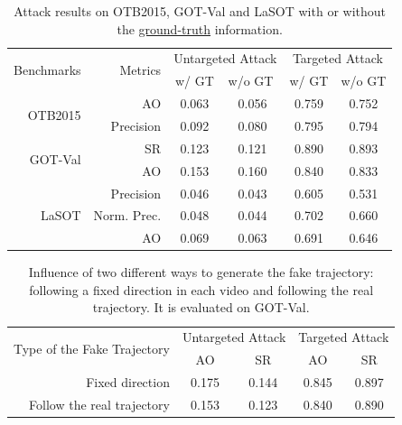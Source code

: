 \documentclass[journal]{IEEEtran}
\begin{document}
\begin{table}[t]
  \centering
  \caption{Attack results on OTB2015, GOT-Val and LaSOT with or without the \uline{ground-truth} information.}
  \begin{tabular}{rrcccc}
  \toprule
  \multirow{2}{*}[-2pt]{Benchmarks} & \multirow{2}{*}[-2pt]{Metrics} & \multicolumn{2}{c}{Untargeted Attack} & \multicolumn{2}{c}{Targeted Attack} \\ \cmidrule{3-6}
                              &                          & w/ GT  & \multicolumn{1}{l}{w/o GT}  & w/ GT  & \multicolumn{1}{l}{w/o GT} \\ \midrule
  \multirow{2}{*}{OTB2015}     & AO                       & 0.063  & 0.056                       & 0.759  & 0.752                      \\
                              & Precision                & 0.092  & 0.080                       & 0.795  & 0.794                      \\ \midrule
  \multirow{2}{*}{GOT-Val}    & SR                       & 0.123  & 0.121                       & 0.890  & 0.893                      \\
                              & AO                       & 0.153  & 0.160                       & 0.840  & 0.833                      \\ \midrule
  \multirow{3}{*}{LaSOT}      & Precision                & 0.046  & 0.043                       & 0.605  & 0.531                      \\
                              & Norm. Prec.              & 0.048  & 0.044                       & 0.702  & 0.660                      \\
                              & AO                       & 0.069  & 0.063                       & 0.691  & 0.646                      \\ \bottomrule
  \end{tabular}
  \label{tab:agent_GT}
\end{table}
\begin{table}[t]
  \centering
  \caption{Influence of two different ways to generate the fake trajectory: following a fixed direction in each video and following the real trajectory. It is evaluated on GOT-Val.}
  \begin{tabular}{@{}rcccc@{}}
  \toprule
  \multirow{2}{*}[-2pt]{Type of the Fake Trajectory} & \multicolumn{2}{c}{Untargeted Attack} & \multicolumn{2}{c}{Targeted Attack} \\ \cmidrule{2-5}
                              & AO                & SR                & AO               & SR               \\ \midrule
  Fixed direction             & 0.175             & 0.144             & 0.845            & 0.897            \\
  Follow the real trajectory  & 0.153             & 0.123             & 0.840            & 0.890            \\ \bottomrule        
  \end{tabular}
  \vspace{-3mm}
  \label{table:direction}
\end{table}
\end{document}
